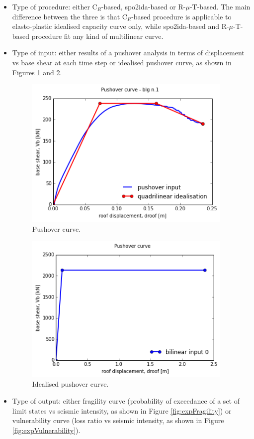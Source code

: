 \begin{itemize}
\item Type of procedure: either C$_R$-based, spo2ida-based or R-$\mu$-T-based. The main difference between the three is that C$_R$-based procedure is applicable to elasto-plastic idealised capacity curve only, while spo2ida-based and R-$\mu$-T-based procedure fit any kind of multilinear curve.
\item Type of input: either results of a pushover analysis in terms of displacement vs base shear at each time step or idealised pushover curve, as shown in Figures \ref{fig:expPushover} and \ref{fig:expIdealised}.

\begin{figure}[!htbp]
\centering
\includegraphics[width=10cm]{./figures/PushoverCurve.png}
\caption{Pushover curve.}
\label{fig:expPushover}
\end{figure}

\begin{figure}[!htbp]
\centering
\includegraphics[width=10cm]{./figures/IdealisedCurve.png}
\caption{Idealised pushover curve.}
\label{fig:expIdealised}
\end{figure}

\item Type of output: either fragility curve (probability of exceedance of a set of limit states vs seismic intensity, as shown in Figure \ref{fig:expFragility}) or vulnerability curve (loss ratio vs seismic intensity, as shown in Figure \ref{fig:expVulnerability}).
\end{itemize}

